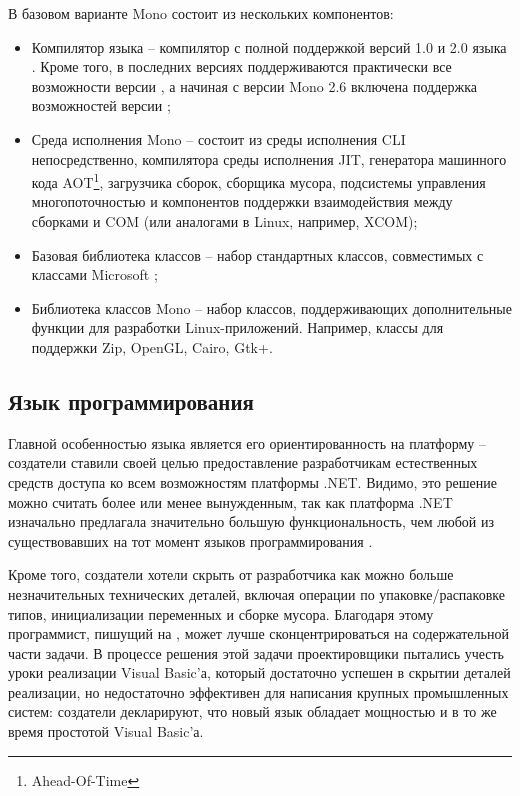 В базовом варианте Mono состоит из нескольких компонентов:
\begin{itemize}
    \item Компилятор языка \CSharp -- компилятор с полной поддержкой версий 1.0 и 2.0 языка \CSharp. Кроме того, в последних версиях поддерживаются практически все возможности версии , а начиная с версии Mono 2.6 включена поддержка возможностей версии ;
    \item Среда исполнения Mono -- состоит из среды исполнения CLI непосредственно, компилятора среды исполнения JIT, генератора машинного кода AOT\footnote{Ahead-Of-Time}, загрузчика сборок, сборщика мусора, подсистемы управления многопоточностью и компонентов поддержки взаимодействия между сборками и COM (или аналогами в Linux, например, XCOM);
    \item Базовая библиотека классов -- набор стандартных классов, совместимых с классами Microsoft \DotNet;
    \item Библиотека классов Mono -- набор классов, поддерживающих дополнительные функции для разработки Linux-приложений. Например, классы для поддержки Zip, OpenGL, Cairo, Gtk+.
\end{itemize}


\subsection{Язык программирования \CSharp}

Главной особенностью языка \CSharp является его ориентированность на платформу \DotNet -- создатели \CSharp ставили своей целью предоставление разработчикам естественных средств доступа ко всем возможностям платформы .NET. Видимо, это решение можно считать более или менее вынужденным, так как платформа .NET изначально предлагала значительно большую функциональность, чем любой из существовавших на тот момент языков программирования \cite{CSharp}.

Кроме того, создатели \CSharp хотели скрыть от разработчика как можно больше незначительных технических деталей, включая операции по упаковке/распаковке типов, инициализации переменных и сборке мусора. Благодаря этому программист, пишущий на \CSharp, может лучше сконцентрироваться на содержательной части задачи. В процессе решения этой задачи проектировщики \CSharp пытались учесть уроки реализации Visual Basic'а, который достаточно успешен в скрытии деталей реализации, но недостаточно эффективен для написания крупных промышленных систем: создатели \CSharp декларируют, что новый язык обладает мощностью \CPP и в то же время простотой Visual Basic'а.


